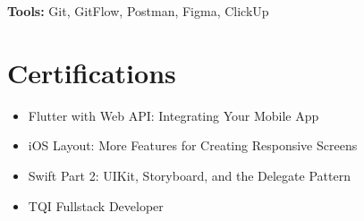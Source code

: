 \documentclass[10pt, letterpaper]{article}
\begin{document}
\textbf{Tools:} Git, GitFlow, Postman, Figma, ClickUp

\section{Certifications}
\begin{itemize}
    \item Flutter with Web API: Integrating Your Mobile App
    \item iOS Layout: More Features for Creating Responsive Screens
    \item Swift Part 2: UIKit, Storyboard, and the Delegate Pattern
    \item TQI Fullstack Developer
\end{itemize}
\end{document}
